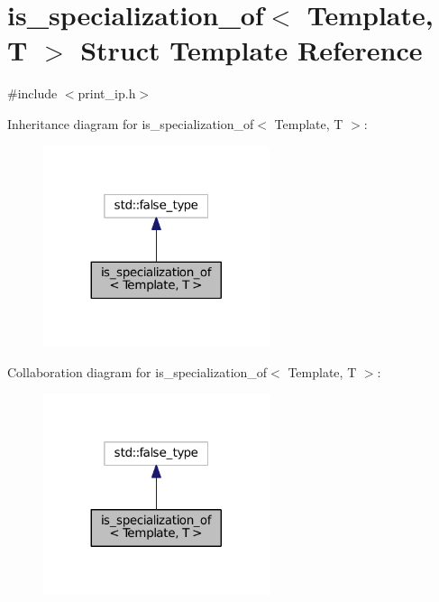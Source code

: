 \hypertarget{structis__specialization__of}{}\section{is\+\_\+specialization\+\_\+of$<$ Template, T $>$ Struct Template Reference}
\label{structis__specialization__of}


{\ttfamily \#include $<$print\+\_\+ip.\+h$>$}



Inheritance diagram for is\+\_\+specialization\+\_\+of$<$ Template, T $>$\+:
\nopagebreak
\begin{figure}[H]
\begin{center}
\leavevmode
\includegraphics[width=188pt]{structis__specialization__of__inherit__graph}
\end{center}
\end{figure}


Collaboration diagram for is\+\_\+specialization\+\_\+of$<$ Template, T $>$\+:
\nopagebreak
\begin{figure}[H]
\begin{center}
\leavevmode
\includegraphics[width=188pt]{structis__specialization__of__coll__graph}
\end{center}
\end{figure}


